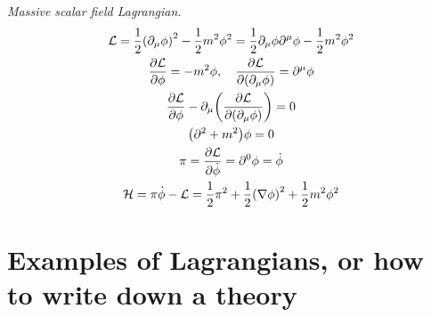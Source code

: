 \documentclass{report}
\begin{document}
\begin{subquests}
	\item \emph{Massive scalar field Lagrangian.}
	\begin{gather*}
		\mathcal L = \frac{1}{2}\pqty{\partial_{\mu}\phi}^2 - \frac{1}{2}m^2\phi^2  = \frac{1}{2}\partial_{\mu}\phi\partial^{\mu}\phi - \frac{1}{2}m^2\phi^2 \\
		\pdv{\mathcal L}{\phi} = -m^2\phi, \quad \pdv{\mathcal L}{\pqty{\partial_{\mu}\phi}} = \partial^{\mu}\phi \\
		\pdv{\mathcal L}{\phi}-\partial_{\mu}\pqty{\pdv{\mathcal L}{\pqty{\partial_{\mu}\phi}}} = 0 \\
		\pqty{\partial^2 + m^2}\phi = 0 \\
		\pi = \pdv{\mathcal L}{\dot{\phi}} = \partial^0 \phi = \dot{\phi} \\
		\mathcal H = \pi\dot{\phi} - \mathcal L = \frac{1}{2}\pi^2 + \frac{1}{2}\pqty{\nabla{\phi}}^2 + \frac{1}{2}m^2\phi^2 \\
	\end{gather*}
\end{subquests}

\chapter{Examples of Lagrangians, or how to write down a theory}
\end{document}
